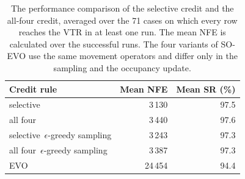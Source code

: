 \begin{table}[htbp]
\centering\small
\caption{The performance comparison of the selective credit and the all-four credit, averaged over the 71 cases on which every row reaches the VTR in at least one run. The mean NFE is calculated over the successful runs. The four variants of SO-EVO use the same movement operators and differ only in the sampling and the occupancy update.}
\label{tab:credit}
\begin{tabular}{lrr}
\toprule
Credit rule & Mean NFE & Mean SR (\%) \\
\midrule
selective & 3\,130 & 97.5 \\
all four & 3\,440 & 97.6 \\
selective\, $\epsilon$-greedy sampling & 3\,243 & 97.3 \\
all four\, $\epsilon$-greedy sampling & 3\,387 & 97.3 \\
EVO & 24\,454 & 94.4 \\
\bottomrule
\end{tabular}
\end{table}

